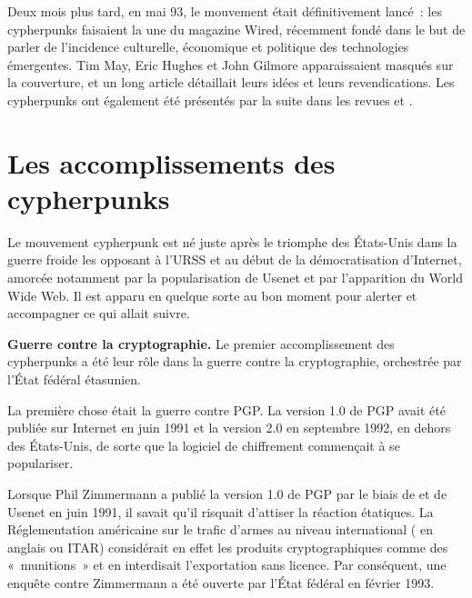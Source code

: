 Deux mois plus tard, en mai 93, le mouvement était définitivement lancé~: les cypherpunks faisaient la une du magazine Wired, récemment fondé dans le but de parler de l'incidence culturelle, économique et politique des technologies émergentes. Tim May, Eric Hughes et John Gilmore apparaissaient masqués sur la couverture, et un long article détaillait leurs idées et leurs revendications. Les cypherpunks ont également été présentés par la suite dans les revues  et .

\section*{Les accomplissements des cypherpunks}

Le mouvement cypherpunk est né juste après le triomphe des États-Unis dans la guerre froide les opposant à l'URSS et au début de la démocratisation d'Internet, amorcée notamment par la popularisation de Usenet et par l'apparition du World Wide Web. Il est apparu en quelque sorte au bon moment pour alerter et accompagner ce qui allait suivre.


\textbf{Guerre contre la cryptographie.} Le premier accomplissement des cypherpunks a été leur rôle dans la guerre contre la cryptographie, orchestrée par l'État fédéral étasunien.

La première chose était la guerre contre PGP. La version 1.0 de PGP avait été publiée sur Internet en juin 1991 et la version 2.0 en septembre 1992, en dehors des États-Unis, de sorte que la logiciel de chiffrement commençait à se populariser.

Lorsque Phil Zimmermann a publié la version 1.0 de PGP par le biais de  et de Usenet en juin 1991, il savait qu'il risquait d'attiser la réaction étatiques. La Réglementation américaine sur le trafic d'armes au niveau international ( en anglais ou ITAR) considérait en effet les produits cryptographiques comme des «~munitions~» et en interdisait l'exportation sans licence. Par conséquent, une enquête contre Zimmermann a été ouverte par l'État fédéral en février 1993.

